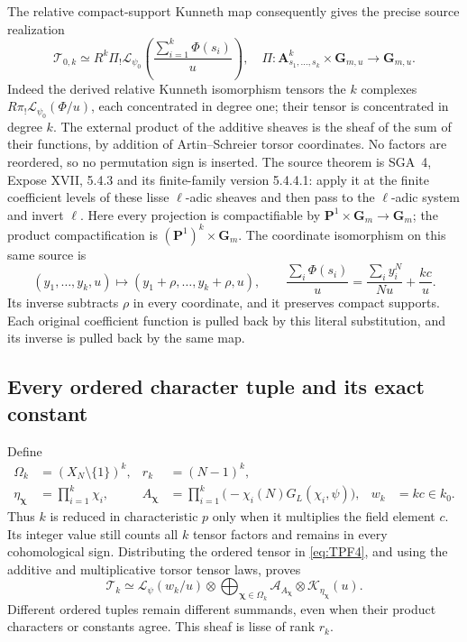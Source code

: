 The relative compact-support Kunneth map consequently gives
the precise source realization
\[
 \mathcal T_{0,k}\simeq
 R^k\Pi_!\mathcal L_{\psi_0}
       \left(\frac{\sum_{i=1}^k\Phi(s_i)}u\right),
 \quad
 \Pi:\mathbf A^k_{s_1,\ldots,s_k}\times\mathbf G_{m,u}
          \longrightarrow\mathbf G_{m,u}.
 \tag{TPF.6}\label{eq:TPF6}
\]
Indeed the derived relative Kunneth isomorphism tensors the
\(k\) complexes \(R\pi_!\mathcal L_{\psi_0}(\Phi/u)\),
each concentrated in degree one; their tensor is
concentrated in degree \(k\). The external product of the
additive sheaves is the sheaf of the sum of their functions,
by addition of Artin--Schreier torsor coordinates. No
factors are reordered, so no permutation sign is inserted.
The source theorem is SGA~4, Expose XVII, 5.4.3
and its finite-family version 5.4.4.1: apply it
at the finite coefficient levels of these
lisse \(\ell\)-adic sheaves and then pass to
the \(\ell\)-adic system and invert \(\ell\).
Here every projection is compactifiable by
\(\mathbf P^1\times\mathbf G_m\to\mathbf G_m\);
the product compactification is
\((\mathbf P^1)^k\times\mathbf G_m\).
The coordinate isomorphism on this same source is
\[
 (y_1,\ldots,y_k,u)\longmapsto
       (y_1+\rho,\ldots,y_k+\rho,u),\qquad
 \frac{\sum_i\Phi(s_i)}u
       =\frac{\sum_i y_i^N}{Nu}+\frac{kc}{u}.
 \tag{TPF.7}\label{eq:TPF7}
\]
Its inverse subtracts \(\rho\) in every coordinate, and it
preserves compact supports. Each original coefficient
function is pulled back by this literal substitution,
and its inverse is pulled back by the same map.

\subsection{Every ordered character tuple and its exact constant}

Define
\[
 \begin{aligned}
 \Omega_k&=(X_N\setminus\{1\})^k,&
 r_k&=(N-1)^k,\\
 \eta_{\boldsymbol\chi}&=\prod_{i=1}^k\chi_i,&
 A_{\boldsymbol\chi}&=\prod_{i=1}^k
            \bigl(-\chi_i(N)G_L(\chi_i,\psi)\bigr),&
 w_k&=kc\in k_0 .
 \end{aligned}
 \tag{TPF.8}\label{eq:TPF8}
\]
Thus \(k\) is reduced in characteristic \(p\) only when it
multiplies the field element \(c\). Its integer value still
counts all \(k\) tensor factors and remains in every
cohomological sign. Distributing the ordered tensor in
\eqref{eq:TPF4}, and using the additive and multiplicative
torsor tensor laws, proves
\[
 \boxed{\displaystyle
 \mathcal T_k\simeq
 \mathcal L_\psi(w_k/u)\otimes
   \bigoplus_{\boldsymbol\chi\in\Omega_k}
        \mathcal A_{A_{\boldsymbol\chi}}
                  \otimes\mathcal K_{\eta_{\boldsymbol\chi}}(u).}
 \tag{TPF.9}\label{eq:TPF9}
\]
Different ordered tuples remain different summands, even
when their product characters or constants agree.
This sheaf is lisse of rank \(r_k\).

